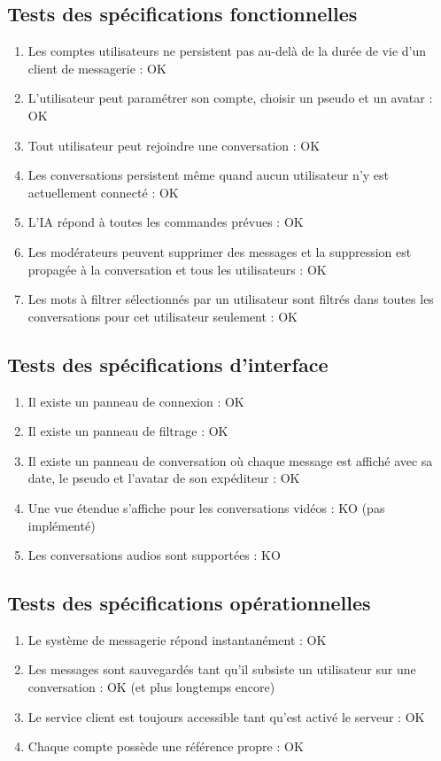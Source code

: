 \documentclass[11pt,dvipsnames,svgnames]{report}
\begin{document}
\subsection{Tests des spécifications fonctionnelles}
\begin{enumerate}
\item Les comptes utilisateurs ne persistent pas au-delà de la durée de vie d'un client de messagerie : OK
\item L'utilisateur peut paramétrer son compte, choisir un pseudo et un avatar : OK
\item Tout utilisateur peut rejoindre une conversation : OK
\item Les conversations persistent même quand aucun utilisateur n'y est actuellement connecté : OK
\item L'IA répond à toutes les commandes prévues : OK
\item Les modérateurs peuvent supprimer des messages et la suppression est propagée à la conversation et tous les utilisateurs : OK
\item Les mots à filtrer sélectionnés par un utilisateur sont filtrés dans toutes les conversations pour cet utilisateur seulement : OK
\end{enumerate}

\subsection{Tests des spécifications d'interface}
\begin{enumerate}
\item Il existe un panneau de connexion : OK
\item Il existe un panneau de filtrage : OK
\item Il existe un panneau de conversation où chaque message est affiché avec sa date, le pseudo et l'avatar de son expéditeur : OK
\item Une vue étendue s'affiche pour les conversations vidéos : KO (pas implémenté)
\item Les conversations audios sont supportées : KO
\end{enumerate}
\subsection{Tests des spécifications opérationnelles}
\begin{enumerate}
\item Le système de messagerie répond instantanément : OK
\item Les messages sont sauvegardés tant qu'il subsiste un utilisateur sur une conversation : OK (et plus longtemps encore)
\item Le service client est toujours accessible tant qu'est activé le serveur : OK
\item Chaque compte possède une référence propre : OK
\end{enumerate}
\end{document}
